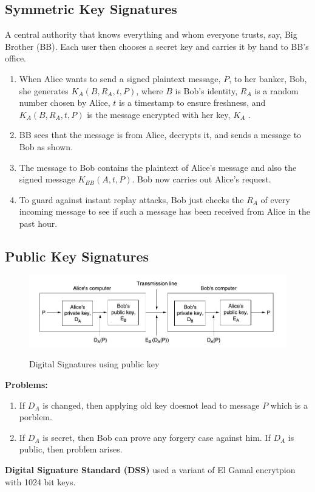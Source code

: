 \documentclass[a4paper,oneside]{book}
\begin{document}
\subsection{Symmetric Key Signatures}
A central authority that knows everything and whom everyone trusts, say, Big Brother (BB). Each user then chooses a secret key and carries it by hand to BB's office.
\begin{enumerate}
\item When Alice wants to send a signed plaintext message, $P$, to her banker, Bob, she generates $K_A (B, R_A , t, P)$, where $B$ is Bob's identity, $R_A$ is a random number chosen by Alice, $t$ is a timestamp to ensure freshness, and $K_A (B, R_A , t, P)$ is the message encrypted with her key, $K_A$ .
\item BB sees that the message is from Alice, decrypts it, and sends a message to Bob as shown. 
\item The message to Bob contains the plaintext of Alice's message and also the signed message $K_{BB} (A, t, P)$. Bob now carries out Alice's request.
\item  To guard against instant replay attacks, Bob just checks the $R_A$ of every incoming message to see if such a message has been received from Alice in the past hour. 
\end{enumerate}
\subsection{Public Key Signatures}
\begin{figure}[H]
\caption{Digital Signatures using public key }
\includegraphics[scale=0.7]{Images/digital_sig_public_key}
\label{fig:dg_key_publickey}
\end{figure}
\textbf{Problems:}
\begin{enumerate}
\item If $D_A$ is changed, then applying old key doesnot lead to message $P$ which is a porblem.
\item If $D_A$ is secret, then Bob can prove any forgery case against him. If $D_A$ is public, then problem arises. 
\end{enumerate}
\textbf{Digital Signature Standard (DSS)} used a variant of El Gamal encrytpion with 1024 bit keys.
\end{document}
